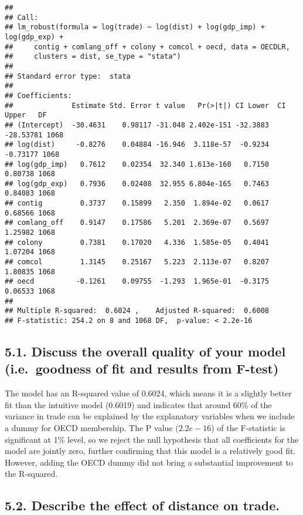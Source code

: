 \documentclass[
]{article}
\begin{document}
\begin{verbatim}
## 
## Call:
## lm_robust(formula = log(trade) ~ log(dist) + log(gdp_imp) + log(gdp_exp) + 
##     contig + comlang_off + colony + comcol + oecd, data = OECDLR, 
##     clusters = dist, se_type = "stata")
## 
## Standard error type:  stata 
## 
## Coefficients:
##              Estimate Std. Error t value   Pr(>|t|) CI Lower  CI Upper   DF
## (Intercept)  -30.4631    0.98117 -31.048 2.402e-151 -32.3883 -28.53781 1068
## log(dist)     -0.8276    0.04884 -16.946  3.118e-57  -0.9234  -0.73177 1068
## log(gdp_imp)   0.7612    0.02354  32.340 1.613e-160   0.7150   0.80738 1068
## log(gdp_exp)   0.7936    0.02408  32.955 6.804e-165   0.7463   0.84083 1068
## contig         0.3737    0.15899   2.350  1.894e-02   0.0617   0.68566 1068
## comlang_off    0.9147    0.17586   5.201  2.369e-07   0.5697   1.25982 1068
## colony         0.7381    0.17020   4.336  1.585e-05   0.4041   1.07204 1068
## comcol         1.3145    0.25167   5.223  2.113e-07   0.8207   1.80835 1068
## oecd          -0.1261    0.09755  -1.293  1.965e-01  -0.3175   0.06533 1068
## 
## Multiple R-squared:  0.6024 ,    Adjusted R-squared:  0.6008 
## F-statistic: 254.2 on 8 and 1068 DF,  p-value: < 2.2e-16
\end{verbatim}

\hypertarget{discuss-the-overall-quality-of-your-model-i.e.-goodness-of-fit-and-results-from-f-test-2}{%
\subsection{5.1. Discuss the overall quality of your model
(i.e.~goodness of fit and results from
F-test)}\label{discuss-the-overall-quality-of-your-model-i.e.-goodness-of-fit-and-results-from-f-test-2}}

The model has an R-squared value of 0.6024, which means it is a slightly
better fit than the intuitive model (0.6019) and indicates that around
60\% of the variance in trade can be explained by the explanatory
variables when we include a dummy for OECD membership. The P value
(\(2.2e-16\)) of the F-statistic is significant at 1\% level, so we
reject the null hypothesis that all coefficients for the model are
jointly zero, further confirming that this model is a relatively good
fit. However, adding the OECD dummy did not bring a substantial
improvement to the R-squared.

\hypertarget{describe-the-effect-of-distance-on-trade.-2}{%
\subsection{5.2. Describe the effect of distance on
trade.}\label{describe-the-effect-of-distance-on-trade.-2}}
\end{document}
